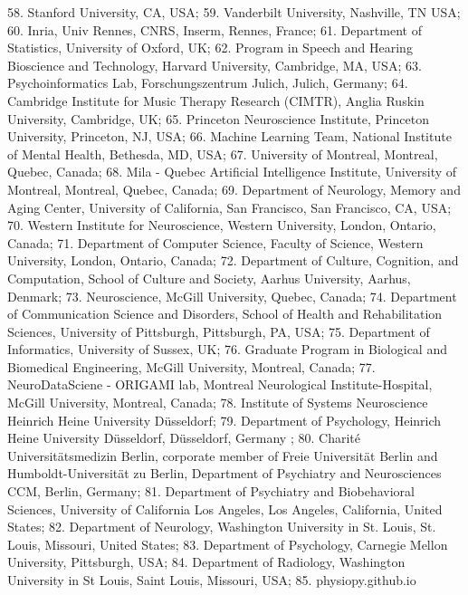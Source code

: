 \documentclass[10pt,a4paper,twocolumns]{proc}
\begin{document}
{58. Stanford University, CA, USA; %
59. Vanderbilt University, Nashville, TN USA; %
60. Inria, Univ Rennes, CNRS, Inserm, Rennes, France; %
61. Department of Statistics, University of Oxford, UK; %
62. Program in Speech and Hearing Bioscience and Technology, Harvard University, Cambridge, MA, USA; %
63. Psychoinformatics Lab, Forschungszentrum Julich, Julich, Germany; %
64. Cambridge Institute for Music Therapy Research (CIMTR), Anglia Ruskin University, Cambridge, UK; %
65. Princeton Neuroscience Institute, Princeton University, Princeton, NJ, USA; %
66. Machine Learning Team, National Institute of Mental Health, Bethesda, MD, USA; %
67. University of Montreal, Montreal, Quebec, Canada; %
68. Mila - Quebec Artificial Intelligence Institute, University of Montreal, Montreal, Quebec, Canada; %
69. Department of Neurology, Memory and Aging Center, University of California, San Francisco, San Francisco, CA, USA; %
70. Western Institute for Neuroscience, Western University, London, Ontario, Canada; %
71. Department of Computer Science, Faculty of Science, Western University, London, Ontario, Canada; %
72. Department of Culture, Cognition, and Computation, School of Culture and Society, Aarhus University, Aarhus, Denmark; %
73. Neuroscience, McGill University, Quebec, Canada; %
74. Department of Communication Science and Disorders, School of Health and Rehabilitation Sciences, University of Pittsburgh, Pittsburgh, PA, USA; %
75. Department of Informatics, University of Sussex, UK; %
76. Graduate Program in Biological and Biomedical Engineering, McGill University, Montreal, Canada; %
77. NeuroDataSciene - ORIGAMI lab, Montreal Neurological Institute-Hospital, McGill University, Montreal, Canada; %
78. Institute of Systems Neuroscience Heinrich Heine University Düsseldorf; %
79. Department of Psychology, Heinrich Heine University Düsseldorf, Düsseldorf, Germany ; %
80. Charité Universitätsmedizin Berlin, corporate member of Freie Universität Berlin and Humboldt-Universität zu Berlin, Department of Psychiatry and Neurosciences CCM, Berlin, Germany; %
81. Department of Psychiatry and Biobehavioral Sciences, University of California Los Angeles, Los Angeles, California, United States; %
82. Department of Neurology, Washington University in St. Louis, St. Louis, Missouri, United States; %
83. Department of Psychology, Carnegie Mellon University, Pittsburgh, USA; %
84. Department of Radiology, Washington University in St Louis, Saint Louis, Missouri, USA; %
85. physiopy.github.io %
}
\\
\end{document}
